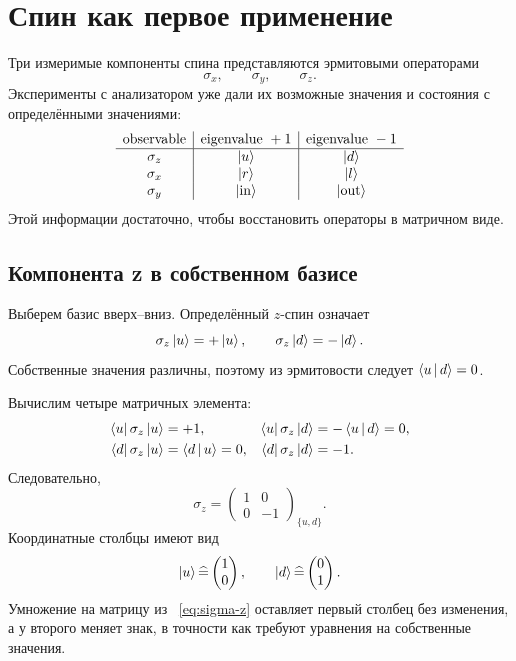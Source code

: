 \section{Спин как первое применение}

Три измеримые компоненты спина представляются эрмитовыми операторами
\[
\sigma_x,\qquad \sigma_y,\qquad \sigma_z.
\]
Эксперименты с анализатором уже дали их возможные значения и состояния с определёнными значениями:
\[
\begin{array}{c|c|c}
\text{observable}&\text{eigenvalue }+1&\text{eigenvalue }-1\\ \hline
\sigma_z&\left\lvert u\right\rangle&\left\lvert d\right\rangle\\
\sigma_x&\left\lvert r\right\rangle&\left\lvert l\right\rangle\\
\sigma_y&\left\lvert\mathrm{in}\right\rangle&\left\lvert\mathrm{out}\right\rangle
\end{array}
\]
Этой информации достаточно, чтобы восстановить операторы в матричном виде.

\subsection{Компонента z в собственном базисе}

Выберем базис вверх--вниз. Определённый \(z\)-спин означает
\begin{equation}
\sigma_z\left\lvert u\right\rangle=+\left\lvert u\right\rangle,
\qquad
\sigma_z\left\lvert d\right\rangle=-\left\lvert d\right\rangle.
\label{eq:sigma-z-eigenvectors}
\end{equation}
Собственные значения различны, поэтому из эрмитовости следует \(\left\langle u\,\middle|\,d\right\rangle=0\).

Вычислим четыре матричных элемента:
\begin{align}
\left\langle u\right\rvert\sigma_z\left\lvert u\right\rangle&=+1,&
\left\langle u\right\rvert\sigma_z\left\lvert d\right\rangle&=-\left\langle u\,\middle|\,d\right\rangle=0,\\
\left\langle d\right\rvert\sigma_z\left\lvert u\right\rangle&=\left\langle d\,\middle|\,u\right\rangle=0,&
\left\langle d\right\rvert\sigma_z\left\lvert d\right\rangle&=-1.
\end{align}
Следовательно,
\begin{equation}
\boxed{
\sigma_z=
\begin{pmatrix}
1&0\\
0&-1
\end{pmatrix}_{\{u,d\}}.}
\label{eq:sigma-z}
\end{equation}
Координатные столбцы имеют вид
\[
\left\lvert u\right\rangle\widehat{=}\begin{pmatrix}1\\0\end{pmatrix},
\qquad
\left\lvert d\right\rangle\widehat{=}\begin{pmatrix}0\\1\end{pmatrix}.
\]
Умножение на матрицу из ~\eqref{eq:sigma-z} оставляет первый столбец без изменения, а у второго меняет знак, в точности как требуют уравнения на собственные значения.

